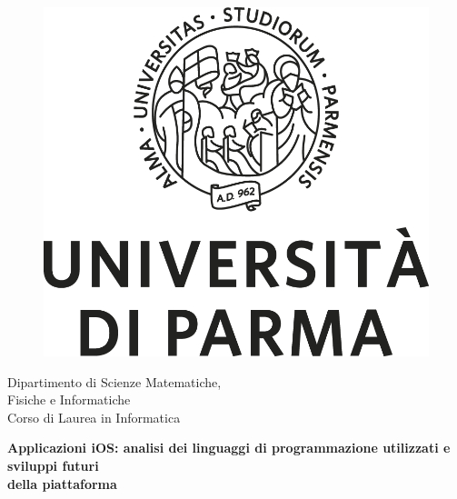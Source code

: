 \begin{titlepage}
  \hypersetup{pageanchor=false}

  \begin{center}
    \begin{figure}
      \centering
      \includegraphics[scale=0.20]{logouni.png}
            \vspace{0.8cm}
    \end{figure}


    \begin{Large}
      Dipartimento di Scienze Matematiche,\\Fisiche e Informatiche\\
      \medskip
      Corso di Laurea in Informatica \\
      \medskip
      \vspace{0.8cm}
      
      \begin{huge}
        \textbf{Applicazioni iOS: analisi dei linguaggi di programmazione utilizzati e sviluppi futuri\\ della piattaforma} \\
      \end{huge}
      

\end{Large}
\end{center}
\end{titlepage}
